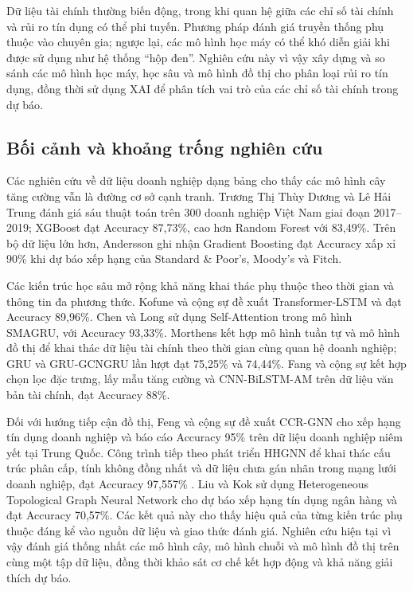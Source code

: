 \documentclass[10pt,twoside]{article}
\begin{document}
Dữ liệu tài chính thường biến động, trong khi quan hệ giữa các chỉ số tài chính và rủi ro tín dụng có thể phi tuyến. Phương pháp đánh giá truyền thống phụ thuộc vào chuyên gia; ngược lại, các mô hình học máy có thể khó diễn giải khi được sử dụng như hệ thống ``hộp đen''. Nghiên cứu này vì vậy xây dựng và so sánh các mô hình học máy, học sâu và mô hình đồ thị cho phân loại rủi ro tín dụng, đồng thời sử dụng XAI để phân tích vai trò của các chỉ số tài chính trong dự báo.
\subsection{Bối cảnh và khoảng trống nghiên cứu}
Các nghiên cứu về dữ liệu doanh nghiệp dạng bảng cho thấy các mô hình cây tăng cường vẫn là đường cơ sở cạnh tranh. Trương Thị Thùy Dương và Lê Hải Trung \cite{thuy_ung_2023} đánh giá sáu thuật toán trên 300 doanh nghiệp Việt Nam giai đoạn 2017--2019; XGBoost đạt Accuracy 87,73\%, cao hơn Random Forest với 83,49\%. Trên bộ dữ liệu lớn hơn, Andersson \cite{andersson_masters_nodate} ghi nhận Gradient Boosting đạt Accuracy xấp xỉ 90\% khi dự báo xếp hạng của Standard \& Poor's, Moody's và Fitch.

Các kiến trúc học sâu mở rộng khả năng khai thác phụ thuộc theo thời gian và thông tin đa phương thức. Kofune và cộng sự \cite{kofune_enhancing_2026} đề xuất Transformer-LSTM và đạt Accuracy 89,96\%. Chen và Long \cite{chen_novel_2020} sử dụng Self-Attention trong mô hình SMAGRU, với Accuracy 93,33\%. Morthens \cite{morthens_credit_nodate} kết hợp mô hình tuần tự và mô hình đồ thị để khai thác dữ liệu tài chính theo thời gian cùng quan hệ doanh nghiệp; GRU và GRU-GCNGRU lần lượt đạt 75,25\% và 74,44\%. Fang và cộng sự \cite{fang_design_2025} kết hợp chọn lọc đặc trưng, lấy mẫu tăng cường và CNN-BiLSTM-AM trên dữ liệu văn bản tài chính, đạt Accuracy 88\%.

Đối với hướng tiếp cận đồ thị, Feng và cộng sự \cite{feng_every_2020} đề xuất CCR-GNN cho xếp hạng tín dụng doanh nghiệp và báo cáo Accuracy 95\% trên dữ liệu doanh nghiệp niêm yết tại Trung Quốc. Công trình tiếp theo phát triển HHGNN để khai thác cấu trúc phân cấp, tính không đồng nhất và dữ liệu chưa gán nhãn trong mạng lưới doanh nghiệp, đạt Accuracy 97,557\% \cite{feng_corporate_2024}. Liu và Kok \cite{liu_prediction_2025} sử dụng Heterogeneous Topological Graph Neural Network cho dự báo xếp hạng tín dụng ngân hàng và đạt Accuracy 70,57\%. Các kết quả này cho thấy hiệu quả của từng kiến trúc phụ thuộc đáng kể vào nguồn dữ liệu và giao thức đánh giá. Nghiên cứu hiện tại vì vậy đánh giá thống nhất các mô hình cây, mô hình chuỗi và mô hình đồ thị trên cùng một tập dữ liệu, đồng thời khảo sát cơ chế kết hợp động và khả năng giải thích dự báo.
\end{document}

